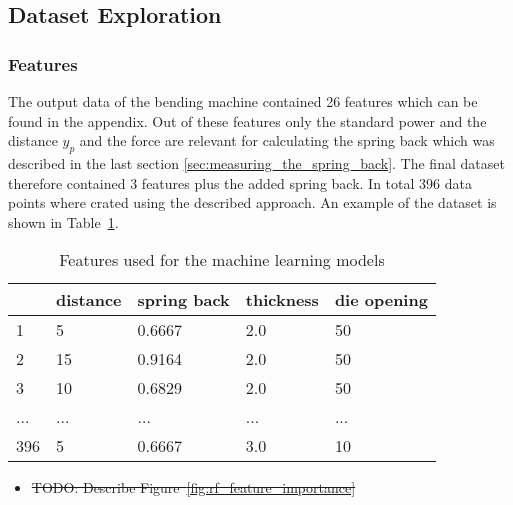 \label{sec:dataset_exploration}

\subsection{Dataset Exploration}

\subsubsection{Features}
The output data of the bending machine contained 26 features which can be found in the appendix. Out of these
features only the standard power and the distance $y_p$ and the force are relevant for calculating the spring back
which was described in the last section \ref{sec:measuring_the_spring_back}.
The final dataset therefore contained 3 features plus the added spring back.
In total 396 data points where crated using the described approach.
An example of the dataset is shown in Table~\ref{tab:dataset_example}.

\begin{table}[H]
    \centering
    \begin{tabular}{|l|l|l|l|l|}
        \hline
        \textbf{} & \textbf{distance} & \textbf{spring back} & \textbf{thickness} & \textbf{die opening} \\ \hline
        1         & 5                 & 0.6667               & 2.0                & 50                   \\
        2         & 15                & 0.9164               & 2.0                & 50                   \\
        3         & 10                & 0.6829               & 2.0                & 50                   \\
        ...       & ...               & ...                  & ...                & ...                  \\
        396       & 5                 & 0.6667               & 3.0                & 10                   \\
        \hline
    \end{tabular}
    \caption{Features used for the machine learning models}
    \label{tab:dataset_example}
\end{table}

\begin{itemize}
    \item \sout{TODO: Describe Figure~\ref{fig:rf_feature_importance}}
\end{itemize}

